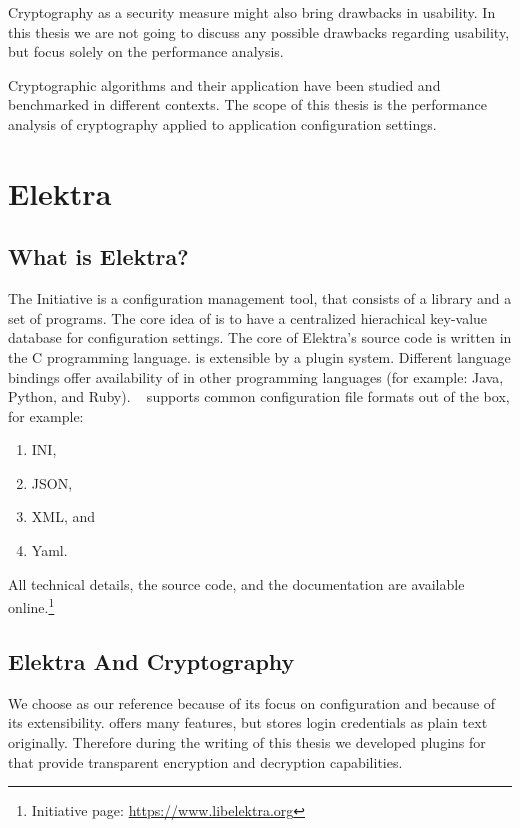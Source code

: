 Cryptography as a security measure might also bring drawbacks in usability.
In this thesis we are not going to discuss any possible drawbacks regarding usability, but focus solely on the performance analysis.

Cryptographic algorithms and their application have been studied and benchmarked in different contexts.\cite{ocf,freebsdtls,thakur2011aes}
The scope of this thesis is the performance analysis of cryptography applied to application configuration settings.

\section{Elektra}

	\subsection{What is Elektra?}

The \elektra{} Initiative is a configuration management tool, that consists of a library and a set of programs.
The core idea of \elektra{} is to have a centralized hierachical key-value database for configuration settings.
The core of Elektra's source code is written in the C programming language.
\elektra{} is extensible by a plugin system.
Different language bindings offer availability of \elektra{} in other programming languages (for example: Java, Python, and Ruby).
\elektra~ supports common configuration file formats out of the box, for example:\cite{elektra-doc,raab2010thesis}
\begin{enumerate}
\item INI,
\item JSON,
\item XML, and
\item Yaml.
\end{enumerate}

All technical details, the source code, and the documentation are available online.\footnote{\elektra{} Initiative page: \url{https://www.libelektra.org}}

	\subsection{Elektra And Cryptography}

We choose \elektra{} as our reference because of its focus on configuration and because of its extensibility.
\elektra{} offers many features, but stores login credentials as plain text originally.
Therefore during the writing of this thesis we developed plugins for \elektra{} that provide transparent encryption and decryption capabilities.


